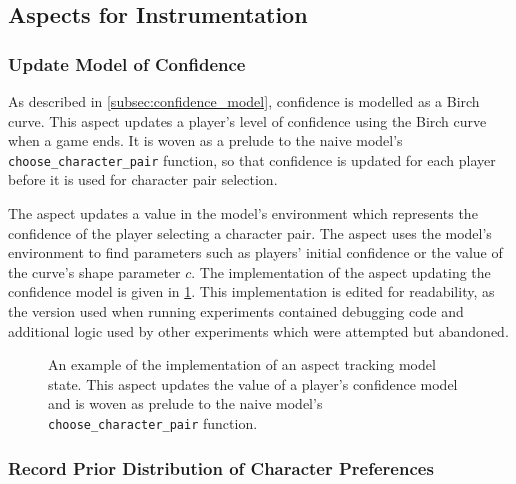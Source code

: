 \subsection{Aspects for Instrumentation}\label{subsec:aspects_instrumenting_model}

\subsubsection{Update Model of Confidence}
\label{confidence_model_aspect_impl_writeup}

As described in \cref{subsec:confidence_model}, confidence is modelled as a
Birch curve. This aspect updates a player's level of confidence using the Birch
curve when a game ends. It is woven as a prelude to the naive model's
\lstinline{choose_character_pair} function, so that confidence is updated for
each player before it is used for character pair selection.

The aspect updates a value in the model's environment which represents the
confidence of the player selecting a character pair. The aspect uses the model's
environment to find parameters such as players' initial confidence or the value
of the curve's shape parameter $c$. The implementation of the aspect updating
the confidence model is given in
\cref{fig:update_confidence_model_aspect_source}. This implementation is edited
for readability, as the version used when running experiments contained
debugging code and additional logic used by other experiments which were
attempted but abandoned.

\begin{figure}[h]
  \centering
  
  \caption{An example of the implementation of an aspect tracking model state.
  This aspect updates the value of a player's confidence model and is woven as
  prelude to the naive model's \lstinline{choose_character_pair} function.}
  \label{fig:update_confidence_model_aspect_source}
\end{figure}

\subsubsection{Record Prior Distribution of Character Preferences}
\label{record_prior_distribution}

